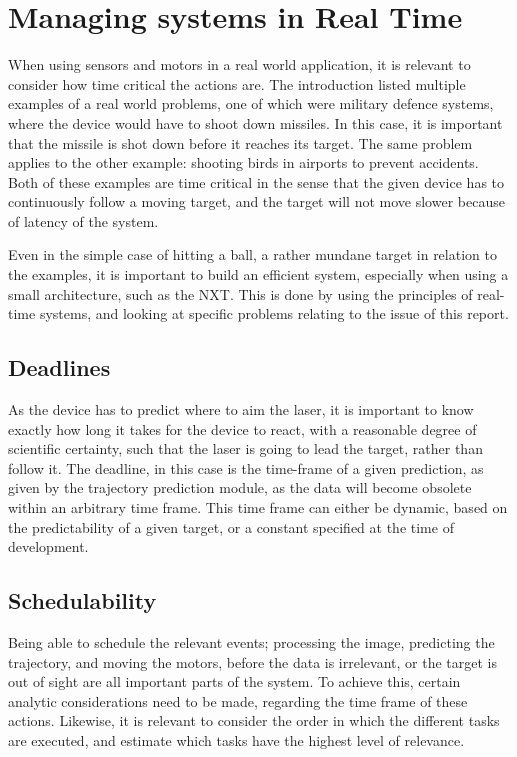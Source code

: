 
\section{Managing systems in Real Time}
\label{sec:rts-intro}
When using sensors and motors in a real world application, it is relevant to consider how time critical the actions are.
The introduction listed multiple examples of a real world problems, one of which were military defence systems, where the device would have to shoot down missiles.
In this case, it is important that the missile is shot down before it reaches its target.
The same problem applies to the other example: shooting birds in airports to prevent accidents.
Both of these examples are time critical in the sense that the given device has to continuously follow a moving target, and the target will not move slower because of latency of the system.

Even in the simple case of hitting a ball, a rather mundane target in relation to the examples, it is important to build an efficient system, especially when using a small architecture, such as the NXT.
This is done by using the principles of real-time systems, and looking at specific problems relating to the issue of this report.

\subsection{Deadlines}
As the device has to predict where to aim the laser, it is important to know exactly how long it takes for the device to react, with a reasonable degree of scientific certainty, such that the laser is going to lead the target, rather than follow it. 
The deadline, in this case is the time-frame of a given prediction, as given by the trajectory prediction module, as the data will become obsolete within an arbitrary time frame.
This time frame can either be dynamic, based on the predictability of a given target, or a constant specified at the time of development.

\subsection{Schedulability}
Being able to schedule the relevant events; processing the image, predicting the trajectory, and moving the motors, before the data is irrelevant, or the target is out of sight are all important parts of the system.
To achieve this, certain analytic considerations need to be made, regarding the time frame of these actions. 
Likewise, it is relevant to consider the order in which the different tasks are executed, and estimate which tasks have the highest level of relevance.

